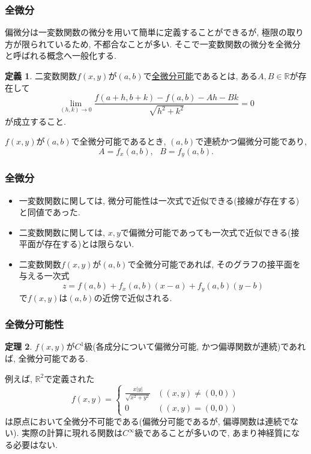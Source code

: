 \documentclass[dvipdfmx,cjk,10.2pt]{beamer}
\newcommand{\R}{\mathbb{R}}
\theoremstyle{definition}
\newtheorem{Thm}{定理}[section]
\newtheorem{Def}[Thm]{定義}
\begin{document}


\begin{frame}
\frametitle{全微分}

偏微分は一変数関数の微分を用いて簡単に定義することができるが, 極限の取り方が限られているため, 不都合なことが多い. 
そこで一変数関数の微分を全微分と呼ばれる概念へ一般化する. 

\begin{Def}
二変数関数$f(x,y)$が$(a,b)$で\underline{全微分可能}であるとは, ある$A, B \in \R$が存在して
$$
\lim_{(h,k)\to0}\frac{f(a+h,b+k)-f(a,b)-Ah-Bk}{\sqrt{h^2+k^2}}=0
$$
が成立すること. 
\end{Def}

$f(x,y)$が$(a,b)$で全微分可能であるとき, $(a,b)$で連続かつ偏微分可能であり, 
$$
A=f_x(a,b), \ \ \ B=f_y(a,b). 
$$
\end{frame}




\begin{frame}
\frametitle{全微分}

\begin{itemize}
\item 一変数関数に関しては, 微分可能性は一次式で近似できる(接線が存在する)と同値であった. 
\item 二変数関数に関しては, $x, y$で偏微分可能であっても一次式で近似できる(接平面が存在する)とは限らない. 
\item 二変数関数$f(x,y)$が$(a, b)$で全微分可能であれば, そのグラフの接平面を与える一次式
$$
z=f(a,b)+f_x(a,b)(x-a)+f_y(a,b)(y-b)
$$
で$f(x,y)$は$(a, b)$の近傍で近似される. 
\end{itemize}

\end{frame}





\begin{frame}
\frametitle{全微分可能性}

\begin{Thm}
$f(x,y)$が$C^1$級(各成分について偏微分可能, かつ偏導関数が連続)であれば, 全微分可能である. 
\end{Thm}

例えば, $\R^2$で定義された
$$
f(x,y)=
\begin{cases}
\frac{x|y|}{\sqrt{x^2+y^2}}  & ((x,y) \ne (0,0)) \\
0 & ((x,y)=(0,0)) 
 \end{cases}
$$
は原点において全微分不可能である(偏微分可能であるが, 偏導関数は連続でない).  
実際の計算に現れる関数は$C^\infty$級であることが多いので, あまり神経質になる必要はない.

\end{frame}
\end{document}
